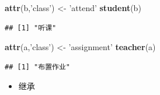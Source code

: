 \documentclass[]{book}
\newenvironment{Shaded}{\begin{snugshade}}{\end{snugshade}}
\newcommand{\KeywordTok}[1]{\textcolor[rgb]{0.13,0.29,0.53}{\textbf{#1}}}
\newcommand{\StringTok}[1]{\textcolor[rgb]{0.31,0.60,0.02}{#1}}
\newcommand{\NormalTok}[1]{#1}
\providecommand{\tightlist}{%
  \setlength{\itemsep}{0pt}\setlength{\parskip}{0pt}}
\begin{document}
\begin{Shaded}
\begin{Highlighting}[]
\KeywordTok{attr}\NormalTok{(b,}\StringTok{'class'}\NormalTok{) <-}\StringTok{ 'attend'}
\KeywordTok{student}\NormalTok{(b)}
\end{Highlighting}
\end{Shaded}

\begin{verbatim}
## [1] "听课"
\end{verbatim}

\begin{Shaded}
\begin{Highlighting}[]
\KeywordTok{attr}\NormalTok{(a,}\StringTok{'class'}\NormalTok{) <-}\StringTok{ 'assignment'}
\KeywordTok{teacher}\NormalTok{(a)}
\end{Highlighting}
\end{Shaded}

\begin{verbatim}
## [1] "布置作业"
\end{verbatim}

\begin{itemize}
\tightlist
\item
  继承
\end{itemize}
\end{document}

